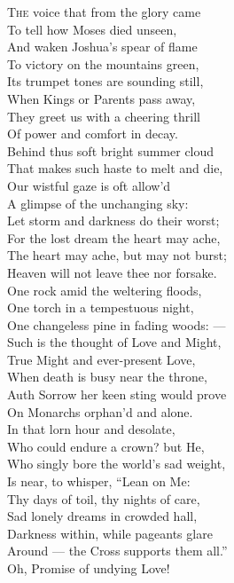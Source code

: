 \textsc{The} voice that from the glory came \\
 To tell how Moses died unseen, \\
 And waken Joshua’s spear of flame \\
 To victory on the mountains green, \\
 Its trumpet tones are sounding still, \\
 When Kings or Parents pass away, \\
 They greet us with a cheering thrill \\
 Of power and comfort in decay. \\
  Behind thus soft bright summer cloud \\
 That makes such haste to melt and die, \\
 Our wistful gaze is oft allow’d \\
 A glimpse of the unchanging sky: \\
 Let storm and darkness do their worst; \\
 For the lost dream the heart may ache, \\
 The heart may ache, but may not burst; \\
 Heaven will not leave thee nor forsake. \\
  One rock amid the weltering floods, \\
 One torch in a tempestuous night, \\
 One changeless pine in fading woods: — \\
 Such is the thought of Love and Might, \\
 True Might and ever-present Love, \\
 When death is busy near the throne, \\
 Auth Sorrow her keen sting would prove \\
 On Monarchs orphan’d and alone. \\
  In that lorn hour and desolate, \\
 Who could endure a crown? but He, \\
 Who singly bore the world’s sad weight, \\
 Is near, to whisper, “Lean on Me: \\
 Thy days of toil, thy nights of care, \\
 Sad lonely dreams in crowded hall, \\
 Darkness within, while pageants glare \\
 Around — the Cross supports them all.” \\
  Oh, Promise of undying Love! \\
